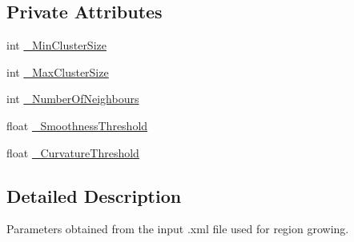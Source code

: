 \subsection*{Private Attributes}
\begin{DoxyCompactItemize}
\item 
int \hyperlink{classRegionGrowingParameters_adbbfdfdf3d5ae9502a9a3c2ffd728ed2}{\-\_\-\-Min\-Cluster\-Size}
\item 
int \hyperlink{classRegionGrowingParameters_a6c8450966fdf96ef230c0d7a7b361174}{\-\_\-\-Max\-Cluster\-Size}
\item 
int \hyperlink{classRegionGrowingParameters_a7f0963eb8dbc2e5dc52bff6695fbe07a}{\-\_\-\-Number\-Of\-Neighbours}
\item 
float \hyperlink{classRegionGrowingParameters_ad994980f1816d8452ec2beecde4a33f4}{\-\_\-\-Smoothness\-Threshold}
\item 
float \hyperlink{classRegionGrowingParameters_abfd3fdb5744de072e1bd9458b5b452ca}{\-\_\-\-Curvature\-Threshold}
\end{DoxyCompactItemize}


\subsection{Detailed Description}
Parameters obtained from the input .xml file used for region growing. 

